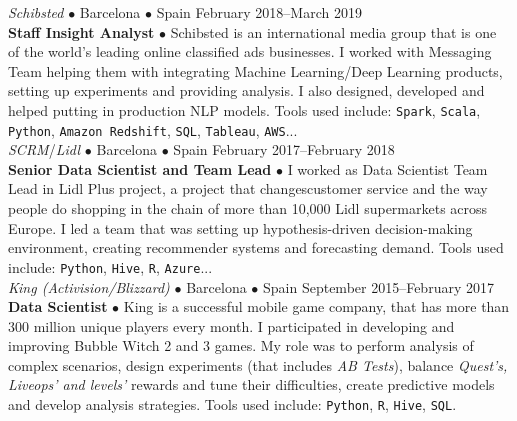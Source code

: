 \documentclass[a4paper, oneside]{scrreprt}
\begin{document}
\vspace{-0.3cm}
\noindent{}
\hspace{-0.15cm}\textit{Schibsted} $\bullet$ 
Barcelona $\bullet$ Spain \hfill February 2018--March 2019\\
\noindent\textbf{\small Staff Insight Analyst } $\bullet$ 
{\small Schibsted is an international media group that is one of the world’s leading online
  classified ads businesses.  I worked with Messaging Team helping them with integrating Machine
  Learning/Deep Learning products, setting up experiments and providing analysis. I also designed,
  developed and helped putting in production NLP models. Tools used include: \texttt{Spark},
  \texttt{Scala}, \texttt{Python}, \texttt{Amazon Redshift}, \texttt{SQL}, \texttt{Tableau}, \texttt{AWS}... }\\

\vspace{-0.3cm}
\noindent{}\textit{SCRM}/\textit{Lidl} $\bullet$ 
Barcelona $\bullet$ Spain \hfill February 2017--February 2018\\
\noindent\textbf{\small Senior Data Scientist and Team Lead} $\bullet$ 
{\small I worked as Data Scientist Team Lead in Lidl Plus project, a project that changescustomer
  service and the way people do shopping in the chain of more than 10,000 Lidl supermarkets across
  Europe. I led a team that was setting up hypothesis-driven decision-making environment, creating
  recommender systems and forecasting demand. Tools used include: \texttt{Python}, \texttt{Hive},
  \texttt{R}, \texttt{Azure}...}\\

\vspace{-0.3cm}
\noindent{}
\hspace{-0.15cm}\textit{King (Activision/Blizzard)} $\bullet$ 
Barcelona $\bullet$ Spain \hfill September 2015--February 2017\\
\noindent\textbf{\small Data Scientist } $\bullet$ 
{\small King is a successful mobile game company, that has more
  than 300 million unique players every month. I participated in developing and
  improving Bubble Witch 2 and 3 games. My
  role was to perform analysis of complex scenarios,
  design experiments (that includes \textit{AB Tests}),
  balance \textit{Quest's, Liveops' and levels'}
  rewards and tune their difficulties,
  create predictive models and develop analysis strategies.
  Tools used include: \texttt{Python}, \texttt{R}, \texttt{Hive}, \texttt{SQL}. }\\
\end{document}
